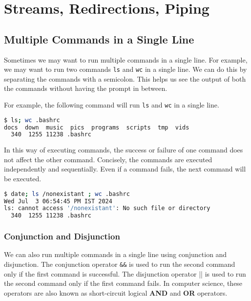 \chapter{Streams, Redirections, Piping}

\section{Multiple Commands in a Single Line}

Sometimes we may want to run multiple commands in a single line.
For example, we may want to run two commands \lstinline|ls| and \lstinline|wc|
in a single line. We can do this by separating the commands with a semicolon.
This helps us see the output of both the commands without having the
prompt in between.

For example, the following command will run \lstinline|ls| and \lstinline|wc| in a single line.

\begin{lstlisting}[language=bash]
$ ls; wc .bashrc
docs  down  music  pics  programs  scripts  tmp  vids
  340  1255 11238 .bashrc
\end{lstlisting}

In this way of executing commands, the success or failure of one
command does not affect the other command. Concisely, the commands
are executed independently and sequentially. Even if a command
fails, the next command will be executed.

\begin{lstlisting}[language=bash]
$ date; ls /nonexistant ; wc .bashrc
Wed Jul  3 06:54:45 PM IST 2024
ls: cannot access '/nonexistant': No such file or directory
  340  1255 11238 .bashrc
\end{lstlisting}

\subsection{Conjunction and Disjunction}

We can also run multiple commands in a single line using conjunction
and disjunction. The conjunction operator \lstinline|&&| is used to run
the second command only if the first command is successful. The disjunction
operator \lstinline|||| is used to run the second command only if the first
command fails. In computer science, these operators are also known as
short-circuit logical \textbf{AND} and \textbf{OR} operators.

